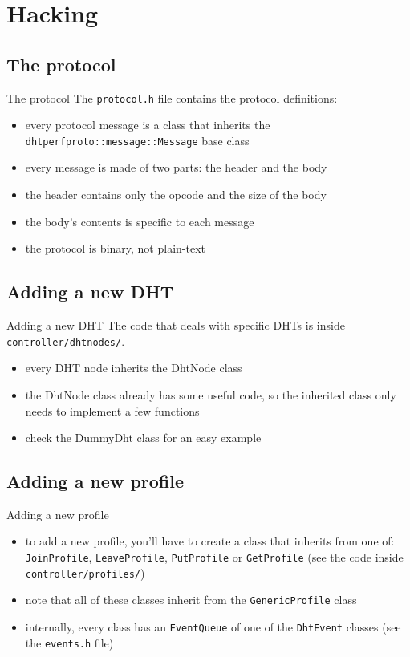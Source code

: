 \documentclass[compress]{beamer}
\begin{document}
\section{Hacking}

\subsection{The protocol}
\begin{frame}{The protocol}
The \texttt{protocol.h} file contains the protocol definitions:
\begin{itemize}
    \item every protocol message is a class that inherits the
    \texttt{dhtperfproto::message::Message} base class
    \item every message is made of two parts: the header and the body
    \item the header contains only the opcode and the size of the body
    \item the body's contents is specific to each message
    \item the protocol is binary, not plain-text
\end{itemize}
\end{frame}

\subsection{Adding a new DHT}
\begin{frame}{Adding a new DHT}
The code that deals with specific DHTs is inside \texttt{controller/dhtnodes/}.
\begin{itemize}
    \item every DHT node inherits the DhtNode class
    \item the DhtNode class already has some useful code, so the inherited
    class only needs to implement a few functions
    \item check the DummyDht class for an easy example
\end{itemize}
\end{frame}

\subsection{Adding a new profile}
\begin{frame}{Adding a new profile}
\begin{itemize}
    \item to add a new profile, you'll have to create a class that inherits from
    one of: \texttt{JoinProfile}, \texttt{LeaveProfile}, \texttt{PutProfile} or
    \texttt{GetProfile} (see the code inside \texttt{controller/profiles/})
    \item note that all of these classes inherit from the
    \texttt{GenericProfile} class
    \item internally, every class has an \texttt{EventQueue} of one of the
    \texttt{DhtEvent} classes (see the \texttt{events.h} file)
\end{itemize}
\end{frame}
\end{document}
